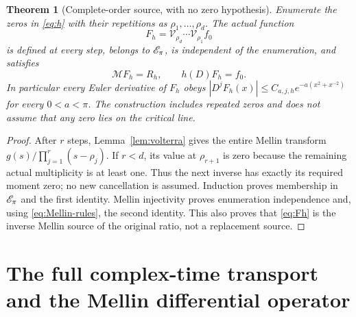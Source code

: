 \documentclass[11pt]{article}
\newcommand{\Mell}{\mathcal M}\newcommand{\Sch}{\mathcal S}
\newtheorem{theorem}{Theorem}[section]
\begin{document}
\begin{theorem}[Complete-order source, with no zero hypothesis]
\label{thm:divisor}
Enumerate the zeros in \eqref{eq:h} with their repetitions as
$\rho_1,\ldots,\rho_d$. The actual function
\begin{equation}\label{eq:Fh}
F_h=\mathcal V_{\rho_d}\cdots\mathcal V_{\rho_1}f_0
\end{equation}
is defined at every step, belongs to $\mathscr E_\pi$, is independent of the
enumeration, and satisfies
\begin{equation}\label{eq:Fh-identities}
\Mell F_h=R_h,\qquad h(D)F_h=f_0.
\end{equation}
In particular every Euler derivative of $F_h$ obeys
$|D^jF_h(x)|\leq C_{a,j,h}e^{-a(x^2+x^{-2})}$ for every
$0<a<\pi$. The construction includes repeated zeros and does not
assume that any zero lies on the critical line.
\end{theorem}
\begin{proof}
After $r$ steps, Lemma~\ref{lem:volterra} gives the entire Mellin
transform $g(s)/\prod_{j=1}^r(s-\rho_j)$. If $r<d$, its value at
$\rho_{r+1}$ is zero because the remaining actual multiplicity is
at least one. Thus the next inverse has exactly its required moment
zero; no new cancellation is assumed. Induction proves membership
in $\mathscr E_\pi$ and the first identity. Mellin injectivity proves
enumeration independence and, using \eqref{eq:Mellin-rules}, the
second identity. This also proves that \eqref{eq:Fh} is the inverse
Mellin source of the original ratio, not a replacement source.
\end{proof}

\section{The full complex-time transport and the Mellin differential operator}
\end{document}
